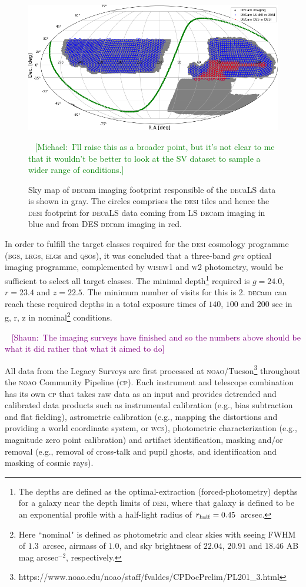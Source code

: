 \documentclass[fleqn,usenatbib]{mnras}
\newcommand{\mike}[1]{~\newline\noindent \textcolor{Green}{{ [Michael:~{#1}]\\}}}
\newcommand{\shaun}[1]{~\newline\noindent \textcolor{Purple}{{ [Shaun:~{#1}]\\}}}
\newcommand{\BGS}{\textsc{bgs}\xspace}
\newcommand{\CP}{\textsc{cp}\xspace}
\newcommand{\DECam}{\textsc{dec}am\xspace}
\newcommand{\DECaLS}{\textsc{dec}a\textsc{LS}\xspace}
\newcommand{\DESI}{\textsc{desi}\xspace}
\newcommand{\ELGs}{\textsc{elg}s\xspace}
\newcommand{\LRGs}{\textsc{lrg}s\xspace}
\newcommand{\NOAO}{\textsc{noao}\xspace}
\newcommand{\QSOs}{\textsc{qso}s\xspace}
\newcommand{\WCS}{\textsc{wcs}\xspace}
\newcommand{\WISE}{\textsc{wise}\xspace}
\newcommand{\Wone}{\textsc{w1}\xspace}
\newcommand{\Wtwo}{\textsc{w2}\xspace}
\begin{document}
\begin{figure}
	\includegraphics[width=\columnwidth]{images/decals_in_desi_footprint}
    \caption{Sky map of \DECam imaging footprint responsible of the \DECaLS data is shown in gray. The circles comprises the \DESI tiles and hence the \DESI footprint for \DECaLS data coming from LS \DECam  imaging in blue and from DES \DECam imaging in red.}
    \label{fig:decals_in_desi}

    \mike{I'll raise this as a broader point, but it's not clear to me that it wouldn't be better to look at the SV dataset to sample a wider range of conditions.}
\end{figure}


In order to fulfill the target classes required for the \DESI cosmology programme (\BGS, \LRGs, \ELGs and \QSOs), it was concluded that a three-band $grz$ optical imaging programme, complemented by \WISE \Wone and \Wtwo photometry, would be sufficient to select all target classes. The minimal  depth\footnote{The depths are defined as the optimal-extraction (forced-photometry) depths for a galaxy near the depth limits of \DESI, where that galaxy is defined to be an exponential profile with a half-light radius of $r_{\rm half}= 0.45$~arcsec.} required is $g=24.0$,$r=23.4$ and $z=22.5$. The minimum number of visits for this is 2. \DECam can reach these required depths in a total exposure times of $140$, $100$ and $200$ sec in g, r, z in nominal\footnote{Here ``nominal" is defined as photometric and clear skies with seeing FWHM of $1.3$~arcsec, airmass of $1.0$, and sky brightness of $22.04$, $20.91$ and $18.46$ AB mag arcsec$^{-2}$, respectively.} conditions.

\shaun{The imaging surveys have finished and so the numbers above should be what it did rather that what it aimed to do}


All data from the Legacy Surveys are first processed at \NOAO/Tucson\footnote{https://www.noao.edu/noao/staff/fvaldes/CPDocPrelim/PL201\_3.html} throughout the \NOAO Community Pipeline (\CP). Each instrument and telescope combination has its own \CP that takes raw data as an input and provides detrended and calibrated data products such as instrumental calibration (e.g., bias subtraction and flat fielding), astrometric calibration (e.g., mapping the distortions and providing a world coordinate system, or \WCS), photometric characterization (e.g., magnitude zero point calibration) and artifact identification, masking and/or removal (e.g., removal of cross-talk and pupil ghosts, and identification and masking of cosmic rays). 
\end{document}
